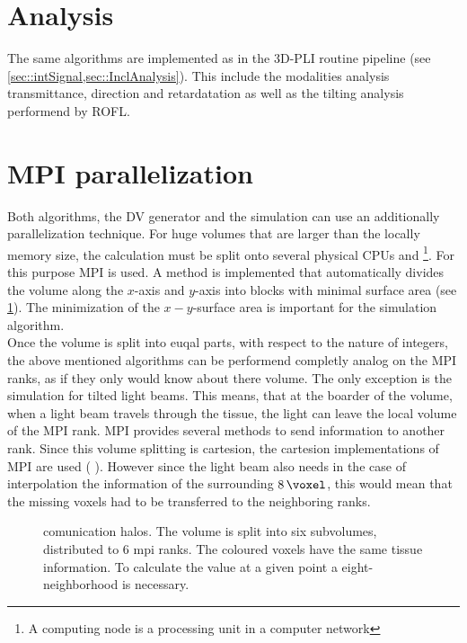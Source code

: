 \section{Analysis}
%
The same algorithms are implemented as in the \ac{3D-PLI} routine pipeline (see \cref{sec::intSignal,sec::InclAnalysis}).
This include the modalities analysis transmittance, direction and retardatation as well as the tilting analysis performend by \ac{ROFL}.
%
%
%
\section{MPI parallelization}\label{sec:mpiSim}
%
Both algorithms, the DV generator and the simulation can use an additionally parallelization technique.
%
For huge volumes that are larger than the locally memory size, the calculation must be split onto several physical \acp{CPU} and \footnote{A computing node is a processing unit in a computer network}.
For this purpose  \ac{MPI} is used.
A method is implemented that automatically divides the volume along the $x$-axis and $y$-axis into blocks with minimal surface area (see \cref{fig:com_halo}).
The minimization of the $x-y$-surface area is important for the simulation algorithm.
\\
Once the volume is split into euqal parts, with respect to the nature of integers, the above mentioned algorithms can be performend completly analog on the \ac{MPI} ranks, as if they only would know about there volume.
The only exception is the simulation for tilted light beams.
This means, that at the boarder of the volume, when a light beam travels through the tissue, the light can leave the local volume of the \ac{MPI} rank.
\ac{MPI} provides several methods to send information to another rank.
Since this volume splitting is cartesion, the cartesion implementations of \ac{MPI} are used (\eg{} ).
However since the light beam also needs in the case of interpolation the information of the surrounding $\SI{8}{\voxel}$, this would mean that the missing voxels had to be transferred to the neighboring ranks.
%
\begin{figure}[!t]
\centering
\setlength{\tikzwidth}{0.85\textwidth}
\caption{comunication halos. The volume is split into six subvolumes, distributed to 6 mpi ranks. The coloured voxels have the same tissue information.  To calculate the value at a given point a eight-neighborhood is necessary.}
\label{fig:com_halo}
\end{figure}
